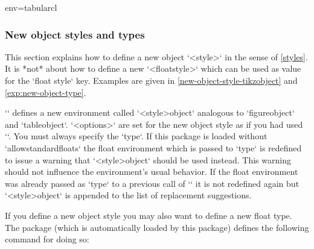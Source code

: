 \begin{tableobject}{env=tabular}{cl}
\subsubsection{New object styles and types}
\label{new-object-styles-and-types}

This section explains how to define a new object `<style>` in the sense of \cref{styles}.
It is *not* about how to define a new `<floatstyle>` which can be used as value for the `float style` key.
Examples are given in \cref{new-object-style-tikzobject} and \cref{exp:new-object-type}.

\DescribeMacro{\NewObjectStyle}
``
defines a new environment called `<style>object` analogous to `figureobject` and `tableobject`.
`<options>` are set for the new object style as if you had used ``.
You must always specify the `type`.
If this package is loaded without `allowstandardfloats`
the float environment which is passed to `type` is redefined to issue a warning that `<style>object` should be used instead.
This warning should not influence the environment's usual behavior.
If the float environment was already passed as `type` to a previous call of `\NewObjectStyle` it is not redefined again but `<style>object` is appended to the list of replacement suggestions.

If you define a new object style you may also want to define a new float type.
The  package (which is automatically loaded by this package) defines the following command for doing so:


\end{tableobject}
